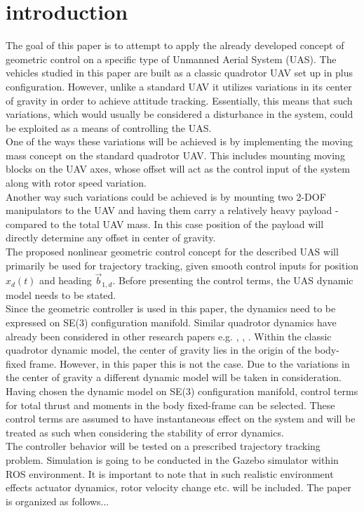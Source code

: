 \section{introduction}
The goal of this paper is to attempt to apply the already developed concept of geometric control on a specific type of Unmanned Aerial System (UAS). The vehicles studied in this paper are built as a classic quadrotor UAV set up in plus configuration. However, unlike a standard UAV it utilizes variations in its center of gravity in order to achieve attitude tracking. Essentially, this means that such variations, which would usually be considered a disturbance in the system, could be exploited as a means of controlling the UAS. \\
One of the ways these variations will be achieved is by implementing the moving mass concept on the standard quadrotor UAV. This includes mounting moving blocks on the UAV axes, whose offset will act as the control input of the system along with rotor speed variation. \\
Another way such variations could be achieved is by mounting two 2-DOF manipulators to the UAV and having them carry a relatively heavy payload - compared to the total UAV mass. In this case position of the payload will directly determine any offset in center of gravity. \\
The proposed nonlinear geometric control concept for the described UAS will primarily be used for trajectory tracking, given smooth control inputs for position $x_d(t)$ and heading $\vec{b}_{1,d}$. Before presenting the control terms, the UAS dynamic model needs to be stated. \\
Since the geometric controller is used in this paper, the dynamics need to be expressed on SE(3) configuration manifold. Similar quadrotor dynamics have already been considered in other research papers e.g. \cite{LeeClanak4}, \cite{LeeClanak2}, \cite{LeeClanak1}. Within the classic quadrotor dynamic model, the center of gravity lies in the origin of the body-fixed frame. However, in this paper this is not the case. Due to the variations in the center of gravity a different dynamic model will be taken in consideration. \\
Having chosen the dynamic model on SE(3) configuration manifold, control terms for total thrust and moments in the body fixed-frame can be selected. These control terms are assumed to have instantaneous effect on the system and will be treated as such when considering the stability of error dynamics. \\ 
The controller behavior will be tested on a prescribed trajectory tracking problem. Simulation is going to be conducted in the Gazebo simulator within ROS environment. It is important to note that in such realistic environment effects actuator dynamics, rotor velocity change etc. will be included.
The paper is organized as follows...
